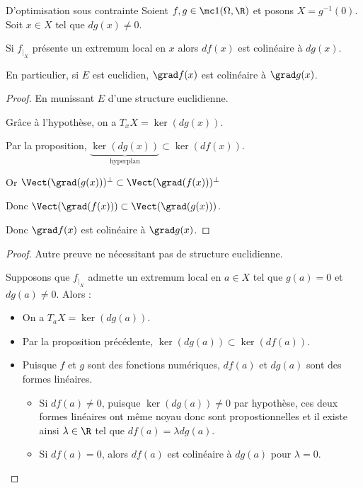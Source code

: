 \begin{theoreme}{D'optimisation sous contrainte}{}
    Soient $f, g \in \mc 1 (\Omega, \R)$ et posons $X = g^{-1}(0)$.
    Soit $x \in X$ tel que $dg(x) \neq 0$. 

    Si $f_{|_X}$ présente un extremum local en $x$ alors $df(x)$ est colinéaire à $dg(x)$. 

    En particulier, si $E$ est euclidien, $\grad f (x)$ est colinéaire à $\grad g(x)$.
\end{theoreme}

\begin{proof}
    En munissant $E$ d'une structure euclidienne. 

    Grâce à l'hypothèse, on a $T_x X = \ker (dg(x))$. 

    Par la proposition, $\underbrace{\ker (dg(x))}_{\text{hyperplan}} \subset \ker (df(x))$.

    Or $\Vect(\grad(g(x)))^\perp \subset \Vect(\grad (f(x)))^\perp$

    Donc $\Vect(\grad (f(x))) \subset \Vect(\grad (g(x)))$.

    Donc $\grad f(x)$ est colinéaire à $\grad g(x)$.
\end{proof}

\begin{proof}
    Autre preuve ne nécessitant pas de structure euclidienne.

    Supposons que $f_{|_X}$ admette un extremum local en $a \in X$ tel que $g(a) = 0$ et $dg(a) \neq 0$. Alors : 
    \begin{itemize}
        \item On a $T_a X = \ker(dg(a))$.
        \item Par la proposition précédente, $\ker(dg(a)) \subset \ker(df(a))$.
        \item Puisque $f$ et $g$ sont des fonctions numériques, $df(a)$ et $dg(a)$ sont des formes linéaires.
        \begin{itemize}
            \item Si $df(a) \neq 0$, puisque $\ker(dg(a)) \neq 0$ par hypothèse, ces deux formes linéaires ont même 
            noyau donc sont propostionnelles et il existe ainsi $\lambda \in \R$ tel que $df(a) = \lambda dg(a)$.
            \item Si $df(a) = 0$, alors $df(a)$ est colinéaire à $dg(a)$ pour $\lambda = 0$. 
        \end{itemize}
    \end{itemize}
\end{proof}

